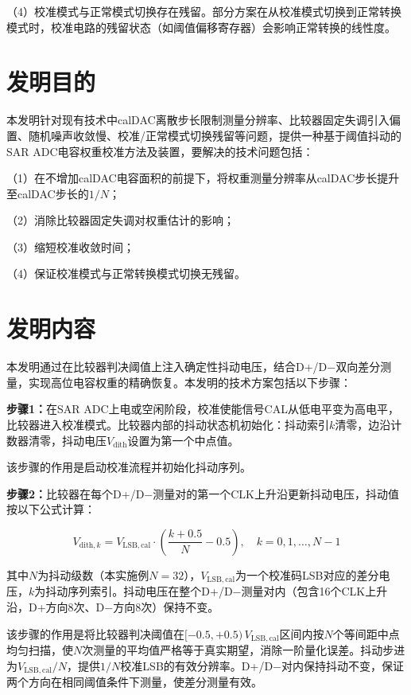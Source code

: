 \documentclass[UTF8,a4paper,11pt]{ctexart}
\begin{document}
（4）校准模式与正常模式切换存在残留。部分方案在从校准模式切换到正常转换模式时，校准电路的残留状态（如阈值偏移寄存器）会影响正常转换的线性度。

\section{发明目的}

本发明针对现有技术中calDAC离散步长限制测量分辨率、比较器固定失调引入偏置、随机噪声收敛慢、校准/正常模式切换残留等问题，提供一种基于阈值抖动的SAR ADC电容权重校准方法及装置，要解决的技术问题包括：

（1）在不增加calDAC电容面积的前提下，将权重测量分辨率从calDAC步长提升至calDAC步长的$1/N$；

（2）消除比较器固定失调对权重估计的影响；

（3）缩短校准收敛时间；

（4）保证校准模式与正常转换模式切换无残留。

\section{发明内容}

本发明通过在比较器判决阈值上注入确定性抖动电压，结合D+/D$-$双向差分测量，实现高位电容权重的精确恢复。本发明的技术方案包括以下步骤：

\textbf{步骤1：}在SAR ADC上电或空闲阶段，校准使能信号CAL从低电平变为高电平，比较器进入校准模式。比较器内部的抖动状态机初始化：抖动索引$k$清零，边沿计数器清零，抖动电压$V_{\mathrm{dith}}$设置为第一个中点值。

该步骤的作用是启动校准流程并初始化抖动序列。

\textbf{步骤2：}比较器在每个D+/D$-$测量对的第一个CLK上升沿更新抖动电压，抖动值按以下公式计算：

\begin{equation}
V_{\mathrm{dith},k} = V_{\mathrm{LSB,cal}} \cdot \left(\frac{k + 0.5}{N} - 0.5\right), \quad k = 0, 1, \ldots, N-1
\end{equation}

其中$N$为抖动级数（本实施例$N=32$），$V_{\mathrm{LSB,cal}}$为一个校准码LSB对应的差分电压，$k$为抖动序列索引。抖动电压在整个D+/D$-$测量对内（包含16个CLK上升沿，D+方向8次、D$-$方向8次）保持不变。

该步骤的作用是将比较器判决阈值在$[-0.5, +0.5)\,V_{\mathrm{LSB,cal}}$区间内按$N$个等间距中点均匀扫描，使$N$次测量的平均值严格等于真实期望，消除一阶量化误差。抖动步进为$V_{\mathrm{LSB,cal}}/N$，提供$1/N$校准LSB的有效分辨率。D+/D$-$对内保持抖动不变，保证两个方向在相同阈值条件下测量，使差分测量有效。
\end{document}
